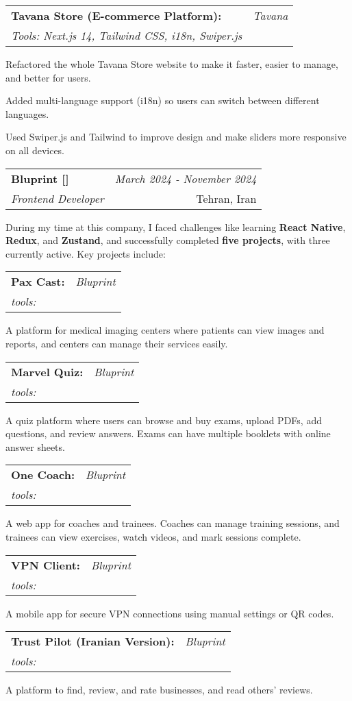 \documentclass[a4paper,11pt]{article}
\makeatletter
\newcommand{\resumeSubheading}[4]{
\vspace{0.5mm}\item
    \begin{tabular*}{0.98\textwidth}[t]{l@{\extracolsep{\fill}}r}
        \textbf{#1} & \textit{\footnotesize{#4}} \\
        \textit{\footnotesize{#3}} &  \footnotesize{#2}\\
    \end{tabular*}
    \vspace{-2.4mm}
}
\newcommand{\resumeItemListStart}{\begin{itemize}[leftmargin=*,labelsep=1mm,itemsep=0.5mm]}
\newcommand{\resumeItemListEnd}{\end{itemize}\vspace{-2mm}}
\makeatother
\begin{document}
\resumeSubheading
  {Tavana Store (E-commerce Platform):}{} 
  {Tools: Next.js 14, Tailwind CSS, i18n, Swiper.js}{Tavana}
  \item Refactored the whole Tavana Store website to make it faster, easier to manage, and better for users.
  \item Added multi-language support (i18n) so users can switch between different languages.
  \item Used Swiper.js and Tailwind to improve design and make sliders more responsive on all devices.


    \vspace{10mm}

  \resumeSubheading
      {{Bluprint [\href{https://bluprint.ir/}{\faIcon{globe}}]}}{Tehran, Iran}
      {Frontend Developer}{March 2024 - November 2024}
      \resumeItemListStart
      \vspace{6mm}
During my time at this company, I faced challenges like learning \textbf{React Native}, \textbf{Redux}, and \textbf{Zustand}, and successfully completed \textbf{five projects}, with three currently active. Key projects include:
      \resumeItemListEnd 
      \vspace{2mm}
\resumeSubheading  {Pax Cast:}{}
{tools:}{Bluprint} 
  \item  A platform for medical imaging centers where patients can view images and reports, and centers can manage their services easily.

\resumeSubheading {Marvel Quiz:} {}
{tools:}{Bluprint} 

  \item A quiz platform where users can browse and buy exams, upload PDFs, add questions, and review answers. Exams can have multiple booklets with online answer sheets.


\resumeSubheading {One Coach:} {}
{tools:}{Bluprint} 

  \item A web app for coaches and trainees. Coaches can manage training sessions, and trainees can view exercises, watch videos, and mark sessions complete.


\resumeSubheading {VPN Client:} {}
{tools:}{Bluprint} 

  \item A mobile app for secure VPN connections using manual settings or QR codes.


\resumeSubheading {Trust Pilot (Iranian Version):}{}
{tools:}{Bluprint} 
\item A platform to find, review, and rate businesses, and read others’ reviews.
\end{document}
